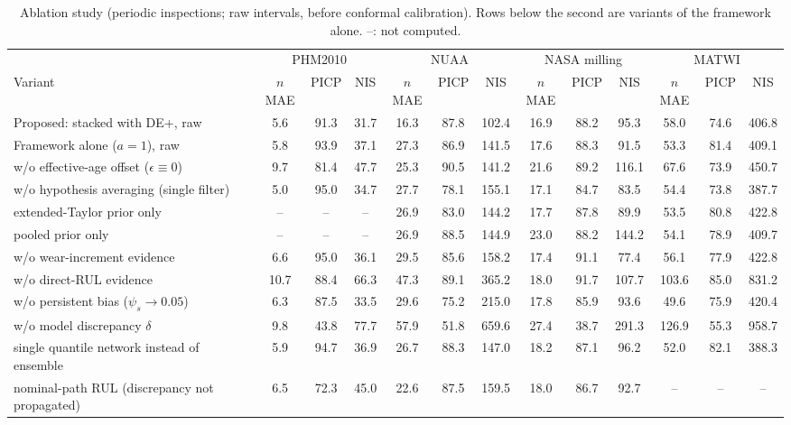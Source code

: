 \begin{table}[!tbp]
\centering
\caption{Ablation study (periodic inspections; raw intervals, before conformal calibration). Rows below the second are variants of the framework alone. --: not computed.}
\label{tab:ablation}
\scriptsize\setlength{\tabcolsep}{2.6pt}
\begin{tabular}{lcccccccccccc}
\toprule
 & \multicolumn{3}{c}{PHM2010} & \multicolumn{3}{c}{NUAA} & \multicolumn{3}{c}{NASA milling} & \multicolumn{3}{c}{MATWI}\\
\cmidrule(lr){2-4}\cmidrule(lr){5-7}\cmidrule(lr){8-10}\cmidrule(lr){11-13}
Variant & $n$MAE & PICP & NIS & $n$MAE & PICP & NIS & $n$MAE & PICP & NIS & $n$MAE & PICP & NIS\\
\midrule
Proposed: stacked with DE+, raw & 5.6 & 91.3 & 31.7 & 16.3 & 87.8 & 102.4 & 16.9 & 88.2 & 95.3 & 58.0 & 74.6 & 406.8\\
Framework alone ($a=1$), raw & 5.8 & 93.9 & 37.1 & 27.3 & 86.9 & 141.5 & 17.6 & 88.3 & 91.5 & 53.3 & 81.4 & 409.1\\
\midrule
w/o effective-age offset ($\epsilon\equiv0$) & 9.7 & 81.4 & 47.7 & 25.3 & 90.5 & 141.2 & 21.6 & 89.2 & 116.1 & 67.6 & 73.9 & 450.7\\
w/o hypothesis averaging (single filter) & 5.0 & 95.0 & 34.7 & 27.7 & 78.1 & 155.1 & 17.1 & 84.7 & 83.5 & 54.4 & 73.8 & 387.7\\
extended-Taylor prior only & -- & -- & -- & 26.9 & 83.0 & 144.2 & 17.7 & 87.8 & 89.9 & 53.5 & 80.8 & 422.8\\
pooled prior only & -- & -- & -- & 26.9 & 88.5 & 144.9 & 23.0 & 88.2 & 144.2 & 54.1 & 78.9 & 409.7\\
w/o wear-increment evidence & 6.6 & 95.0 & 36.1 & 29.5 & 85.6 & 158.2 & 17.4 & 91.1 & 77.4 & 56.1 & 77.9 & 422.8\\
w/o direct-RUL evidence & 10.7 & 88.4 & 66.3 & 47.3 & 89.1 & 365.2 & 18.0 & 91.7 & 107.7 & 103.6 & 85.0 & 831.2\\
w/o persistent bias ($\psi_s\to0.05$) & 6.3 & 87.5 & 33.5 & 29.6 & 75.2 & 215.0 & 17.8 & 85.9 & 93.6 & 49.6 & 75.9 & 420.4\\
w/o model discrepancy $\delta$ & 9.8 & 43.8 & 77.7 & 57.9 & 51.8 & 659.6 & 27.4 & 38.7 & 291.3 & 126.9 & 55.3 & 958.7\\
single quantile network instead of ensemble & 5.9 & 94.7 & 36.9 & 26.7 & 88.3 & 147.0 & 18.2 & 87.1 & 96.2 & 52.0 & 82.1 & 388.3\\
nominal-path RUL (discrepancy not propagated) & 6.5 & 72.3 & 45.0 & 22.6 & 87.5 & 159.5 & 18.0 & 86.7 & 92.7 & -- & -- & --\\

\end{tabular}
\end{table}
